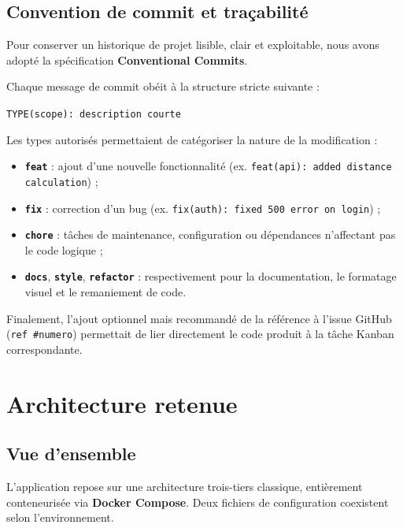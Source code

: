 \documentclass[11pt,a4paper]{article}
\begin{document}
\subsection{Convention de commit et traçabilité}

Pour conserver un historique de projet lisible, clair et exploitable, nous avons adopté la spécification \textbf{Conventional Commits}.

Chaque message de commit obéit à la structure stricte suivante :
\begin{center}
\texttt{TYPE(scope): description courte}
\end{center}

Les types autorisés permettaient de catégoriser la nature de la modification :
\begin{itemize}
  \item \textbf{\texttt{feat}} : ajout d'une nouvelle fonctionnalité (ex. \texttt{feat(api): added distance calculation}) ;
  \item \textbf{\texttt{fix}} : correction d'un bug (ex. \texttt{fix(auth): fixed 500 error on login}) ;
  \item \textbf{\texttt{chore}} : tâches de maintenance, configuration ou dépendances n'affectant pas le code logique ;
  \item \textbf{\texttt{docs}}, \textbf{\texttt{style}}, \textbf{\texttt{refactor}} : respectivement pour la documentation, le formatage visuel et le remaniement de code.
\end{itemize}

Finalement, l'ajout optionnel mais recommandé de la référence à l'issue GitHub (\texttt{ref \#numero}) permettait de lier directement le code produit à la tâche Kanban correspondante.

\newpage
\section{Architecture retenue}

\subsection{Vue d'ensemble}

L'application repose sur une architecture trois-tiers classique, entièrement conteneurisée via \textbf{Docker Compose}. Deux fichiers de configuration coexistent selon l'environnement.
\end{document}
